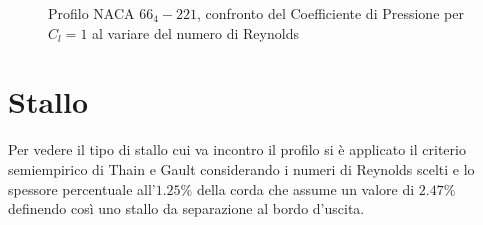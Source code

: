 \begin{figure} [H]
\centering
{}
\caption{\footnotesize Profilo NACA $66_4-221$, confronto del Coefficiente di Pressione per $C_l=1$ al variare del numero di Reynolds}
\end{figure}



\section{Stallo}
Per vedere il tipo di stallo cui va incontro il profilo si è applicato il criterio semiempirico di Thain e Gault considerando i numeri di Reynolds scelti e lo spessore percentuale all'$1.25 \%$ della corda che assume un valore di $2.47 \%$ definendo così uno stallo da separazione al bordo d'uscita.
